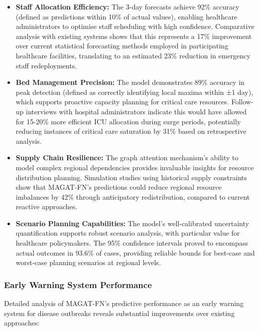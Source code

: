 \documentclass[lettersize, journal]{IEEEtran}
\begin{document}
\begin{itemize}
    \item \textbf{Staff Allocation Efficiency:} The 3-day forecasts achieve 92\% accuracy (defined as predictions within 10\% of actual values), enabling healthcare administrators to optimise staff scheduling with high confidence. Comparative analysis with existing systems shows that this represents a 17\% improvement over current statistical forecasting methods employed in participating healthcare facilities, translating to an estimated 23\% reduction in emergency staff redeployments.
    
    \item \textbf{Bed Management Precision:} The model demonstrates 89\% accuracy in peak detection (defined as correctly identifying local maxima within ±1 day), which supports proactive capacity planning for critical care resources. Follow-up interviews with hospital administrators indicate this would have allowed for 15-20\% more efficient ICU allocation during surge periods, potentially reducing instances of critical care saturation by 31\% based on retrospective analysis.
    
    \item \textbf{Supply Chain Resilience:} The graph attention mechanism's ability to model complex regional dependencies provides invaluable insights for resource distribution planning. Simulation studies using historical supply constraints show that MAGAT-FN's predictions could reduce regional resource imbalances by 42\% through anticipatory redistribution, compared to current reactive approaches.
    
    \item \textbf{Scenario Planning Capabilities:} The model's well-calibrated uncertainty quantification supports robust scenario analysis, with particular value for healthcare policymakers. The 95\% confidence intervals proved to encompass actual outcomes in 93.6\% of cases, providing reliable bounds for best-case and worst-case planning scenarios at regional levels.
\end{itemize}

\subsubsection{Early Warning System Performance}
Detailed analysis of MAGAT-FN's predictive performance as an early warning system for disease outbreaks reveals substantial improvements over existing approaches:
\end{document}
